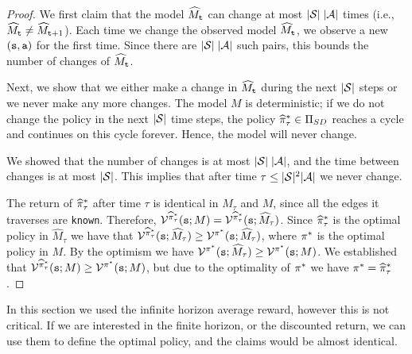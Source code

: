 \begin{proof}
We first claim that the model $\widehat{M}_{\tt t}$ can change  at
most $|\mathcal{S}|\;|\mathcal{A}|$ times (i.e.,  $\widehat{M}_{\tt t} \neq
\widehat{M}_{{\tt t}+1}$). Each time we change the observed model
$\widehat{M}_{\tt t}$, we observe a new $({\tt s},{\tt a})$ for the
first time. Since there are $|\mathcal{S}|\;|\mathcal{A}|$ such pairs, this
bounds the number of changes of  $\widehat{M}_{\tt t}$.

Next, we show that we either make a change in $\widehat{M}_{\tt t}$
during the next $|\mathcal{S}|$ steps or we never make any more changes.
The model $M$ is deterministic; if we do not change the policy in
the next $|\mathcal{S}|$ time steps, the policy
$\widehat{\pi}^*_\tau \in {\Pi _{SD}}$ reaches a cycle and
continues on this cycle forever. Hence, the model will never change.

We showed that the number of changes is at most
$|\mathcal{S}|\;|\mathcal{A}|$, and the time between changes is at most
$|\mathcal{S}|$. This implies that after time $\tau\leq
|\mathcal{S}|^2|\mathcal{A}|$ we never change.

The return of $\widehat{\pi}^*_\tau$ after time $\tau$
is identical in $\widehat{M}_\tau$ and $M$, since all the edges
it traverses are \texttt{known}. Therefore, $\mathcal{V}^{\widehat{\pi}^*_\tau}({\tt s};M)=\mathcal{V}^{\widehat{\pi}^*_\tau}({\tt s};\widehat{M}_\tau)$. Since $\widehat{\pi}^*_\tau$ is the optimal policy in $\widehat{M}_\tau$ we have that $\mathcal{V}^{\widehat{\pi}^*_\tau}({\tt s};\widehat{M}_\tau)\geq \mathcal{V}^{\pi^*}({\tt s};\widehat{M}_\tau)$, where $\pi^*$ is the optimal policy in $M$. By the optimism we have $ \mathcal{V}^{\pi^*}({\tt s};\widehat{M}_\tau)\geq  \mathcal{V}^{\pi^*}({\tt s};M) $. We established that $ \mathcal{V}^{\widehat{\pi}^*_\tau}({\tt s};M) \geq \mathcal{V}^{\pi^*}({\tt s};M) $, but due to the optimality of $\pi^*$ we have $\pi^*=\widehat{\pi}^*_\tau$.
%
\end{proof}

\begin{remark}
In this section we used the infinite horizon average reward, however
this is not critical. If we are interested in the finite horizon, or
the discounted return, we can use them to define the optimal policy,
and the claims would be almost identical.
\end{remark}

